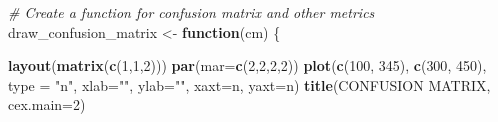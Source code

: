 \documentclass[
]{article}
\newenvironment{Shaded}{\begin{snugshade}}{\end{snugshade}}
\newcommand{\AttributeTok}[1]{\textcolor[rgb]{0.13,0.29,0.53}{#1}}
\newcommand{\CommentTok}[1]{\textcolor[rgb]{0.56,0.35,0.01}{\textit{#1}}}
\newcommand{\ControlFlowTok}[1]{\textcolor[rgb]{0.13,0.29,0.53}{\textbf{#1}}}
\newcommand{\DecValTok}[1]{\textcolor[rgb]{0.00,0.00,0.81}{#1}}
\newcommand{\FunctionTok}[1]{\textcolor[rgb]{0.13,0.29,0.53}{\textbf{#1}}}
\newcommand{\NormalTok}[1]{#1}
\newcommand{\OtherTok}[1]{\textcolor[rgb]{0.56,0.35,0.01}{#1}}
\newcommand{\StringTok}[1]{\textcolor[rgb]{0.31,0.60,0.02}{#1}}
\begin{document}
\begin{Shaded}
\begin{Highlighting}[]
\CommentTok{\# Create a function for confusion matrix and other metrics}
\NormalTok{draw\_confusion\_matrix }\OtherTok{\textless{}{-}} \ControlFlowTok{function}\NormalTok{(cm) \{}

  \FunctionTok{layout}\NormalTok{(}\FunctionTok{matrix}\NormalTok{(}\FunctionTok{c}\NormalTok{(}\DecValTok{1}\NormalTok{,}\DecValTok{1}\NormalTok{,}\DecValTok{2}\NormalTok{)))}
  \FunctionTok{par}\NormalTok{(}\AttributeTok{mar=}\FunctionTok{c}\NormalTok{(}\DecValTok{2}\NormalTok{,}\DecValTok{2}\NormalTok{,}\DecValTok{2}\NormalTok{,}\DecValTok{2}\NormalTok{))}
  \FunctionTok{plot}\NormalTok{(}\FunctionTok{c}\NormalTok{(}\DecValTok{100}\NormalTok{, }\DecValTok{345}\NormalTok{), }\FunctionTok{c}\NormalTok{(}\DecValTok{300}\NormalTok{, }\DecValTok{450}\NormalTok{), }\AttributeTok{type =} \StringTok{"n"}\NormalTok{, }\AttributeTok{xlab=}\StringTok{""}\NormalTok{, }\AttributeTok{ylab=}\StringTok{""}\NormalTok{, }\AttributeTok{xaxt=}\StringTok{\textquotesingle{}n\textquotesingle{}}\NormalTok{, }\AttributeTok{yaxt=}\StringTok{\textquotesingle{}n\textquotesingle{}}\NormalTok{)}
  \FunctionTok{title}\NormalTok{(}\StringTok{\textquotesingle{}CONFUSION MATRIX\textquotesingle{}}\NormalTok{, }\AttributeTok{cex.main=}\DecValTok{2}\NormalTok{)}


\end{Highlighting}
\end{Shaded}
\end{document}
